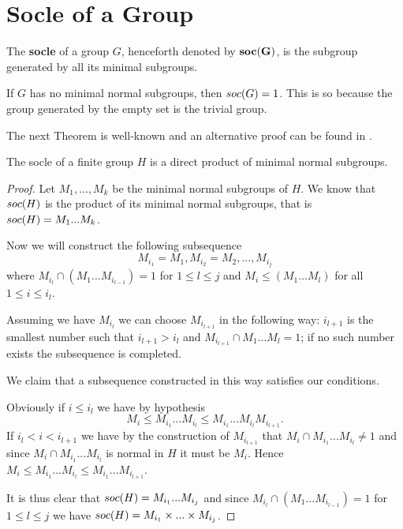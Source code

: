 \section{Socle of a Group}

\begin{definition}
    The \textbf{socle} of a group $G$, henceforth denoted by $\mathbf{soc {(G)}}$, is the subgroup generated by all its minimal subgroups.
\end{definition}

If $G$ has no minimal normal subgroups, then $soc {(G)} = 1$. This is so because the group generated by the empty set is the trivial group.

The next Theorem is well-known and an alternative proof can be found in \cite[p.~87]{RobinsonCTG}. 
\begin{theorem}
    The socle of a finite group $H$ is a direct product of minimal normal subgroups.
\end{theorem}

\begin{proof}
    Let $M_1,...,M_k$ be the minimal normal subgroups of $H$. We know that $soc {(H)}$ is the product of its minimal normal subgroups, that is $soc {(H)} = M_1...M_k$.

    Now we will construct the following subsequence $$M_{i_1} = M_1, M_{i_2} = M_2, ..., M_{i_j}$$ where $M_{i_l} \cap (M_1...M_{i_{l-1}}) = 1$ for $1 \le l \le j$ and $M_i \le (M_1...M_{l})$ for all $1 \le i \le i_l$.

    Assuming we have $M_{i_l}$ we can choose $M_{i_{l+1}}$ in the following way: $i_{l+1}$ is the smallest number such that $i_{l+1} > i_l$ and $M_{i_{l+1}} \cap M_1...M_l = 1$; if no such number exists the subsequence is completed.

    We claim that a subsequence constructed in this way satisfies our conditions.
    
    Obviously if $i \le i_l$ we have by hypothesis 
    $$
    M_i \le M_{i_1}...M_{i_l} \le M_{i_1}...M_{i_l}M_{i_{l+1}}.
    $$ 
    If $i_l < i < i_{l+1}$ we have by the construction of $M_{i_{l+1}}$ that $M_i \cap M_{i_1}...M_{i_l} \ne 1$ and since $M_i \cap M_{i_1}...M_{i_l}$ is normal in $H$ it must be $M_i$. Hence $M_i \le M_{i_1}...M_{i_l} \le M_{i_1}...M_{i_{l+1}}$.

    It is thus clear that $soc {(H)} = M_{i_1}...M_{i_j}$ and since $M_{i_l} \cap (M_1...M_{i_{l-1}}) = 1$ for $1 \le l \le j$ we have $soc {(H)} = M_{i_1}\times ... \times M_{i_j}$.
\end{proof}

